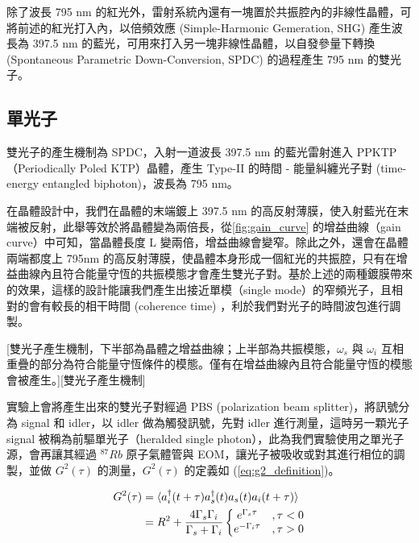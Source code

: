 \documentclass[class=NCU_thesis, crop=false]{standalone}
\begin{document}
除了波長 795 nm 的紅光外，雷射系統內還有一塊置於共振腔內的非線性晶體，可將前述的紅光打入內，以倍頻效應 (Simple-Harmonic Gemeration, SHG) 產生波長為 397.5 nm 的藍光，可用來打入另一塊非線性晶體，以自發參量下轉換 (Spontaneous Parametric Down-Conversion, SPDC) 的過程產生 795 nm 的雙光子。


\subsection{單光子}
\label{subsection:single_photon}
雙光子的產生機制為 SPDC，入射一道波長 397.5 nm 的藍光雷射進入 PPKTP （Periodically Poled KTP）晶體，產生 Type-II 的時間 - 能量糾纏光子對 (time-energy entangled biphoton)，波長為 795 nm。

在晶體設計中，我們在晶體的末端鍍上 397.5 nm 的高反射薄膜，使入射藍光在末端被反射，此舉等效於將晶體變為兩倍長，從\cref{fig:gain_curve} 的增益曲線（gain curve）中可知，當晶體長度 L 變兩倍，增益曲線會變窄\cite{chuu2012miniature}。除此之外，還會在晶體兩端都度上 795nm 的高反射薄膜，使晶體本身形成一個紅光的共振腔，只有在增益曲線內且符合能量守恆的共振模態才會產生雙光子對。基於上述的兩種鍍膜帶來的效果，這樣的設計能讓我們產生出接近單模（single mode）的窄頻光子\cite{wu2017bright}，且相對的會有較長的相干時間 (coherence time) ，利於我們對光子的時間波包進行調製。

[雙光子產生機制，下半部為晶體之增益曲線；上半部為共振模態，$\omega_s$ 與 $\omega_i$ 互相重疊的部分為符合能量守恆條件的模態。僅有在增益曲線內且符合能量守恆的模態會被產生。][雙光子產生機制]

實驗上會將產生出來的雙光子對經過 PBS (polarization beam splitter)，將訊號分為 signal 和 idler，以 idler 做為觸發訊號，先對 idler 進行測量，這時另一顆光子 signal 被稱為前驅單光子（heralded single photon），此為我們實驗使用之單光子源，會再讓其經過 $^{87}Rb$ 原子氣體管與 EOM，讓光子被吸收或對其進行相位的調製，並做 $G^{2}(\tau)$ 的測量\cite{PhysRevLett.101.103601}，$G^{2}(\tau)$ 的定義如 (\ref{eq:g2_definition})。

\begin{equation}
\begin{split}
    G^{2}(\tau)&=\braket{a^{\dagger}_{i}(t+\tau)a^{\dagger}_{s}(t)a_{s}(t)a_{i}(t+\tau)}\\
    &=R^2+\frac{4\Gamma_{s}\Gamma_{i}}{\Gamma_{s}+\Gamma_{i}}\left\{\begin{matrix}
        e^{\Gamma_{s}\tau} & ,\tau<0\\
        e^{-\Gamma_{i}\tau} & ,\tau>0
        \end{matrix}\right.
\label{eq:g2_definition}
\end{split}
\end{equation}
\end{document}
